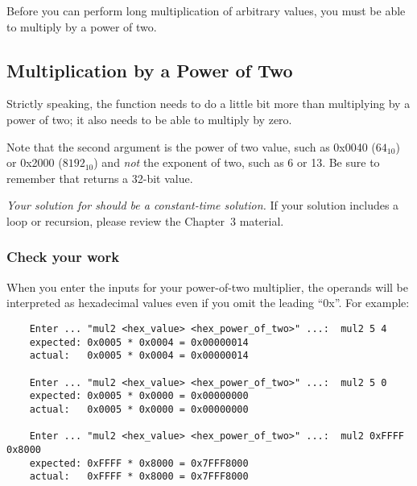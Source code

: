 Before you can perform long multiplication of arbitrary values, you must be able to multiply by a power of two.

\subsection{Multiplication by a Power of Two}

Strictly speaking, the  function needs to do a little bit more than multiplying by a power of two;
it also needs to be able to multiply by zero.
\begin{description}
\end{description}

Note that the second argument is the power of two value, such as 0x0040 ($64_{10}$) or 0x2000 ($8192_{10}$) and \textit{not} the exponent of two, such as 6 or 13.
Be sure to remember that  returns a 32-bit value.

\textit{Your solution for  should be a constant-time solution.}
If your solution includes a loop or recursion, please review the Chapter~3 material.

\subsubsection*{Check your work}

\begin{description}
\end{description}
When you enter the inputs for your power-of-two multiplier, the operands will be interpreted as hexadecimal values even if you omit the leading ``0x''.
For example:
\begin{verbatim}
    Enter ... "mul2 <hex_value> <hex_power_of_two>" ...:  mul2 5 4
    expected: 0x0005 * 0x0004 = 0x00000014
    actual:   0x0005 * 0x0004 = 0x00000014

    Enter ... "mul2 <hex_value> <hex_power_of_two>" ...:  mul2 5 0
    expected: 0x0005 * 0x0000 = 0x00000000
    actual:   0x0005 * 0x0000 = 0x00000000

    Enter ... "mul2 <hex_value> <hex_power_of_two>" ...:  mul2 0xFFFF 0x8000
    expected: 0xFFFF * 0x8000 = 0x7FFF8000
    actual:   0xFFFF * 0x8000 = 0x7FFF8000
\end{verbatim}

